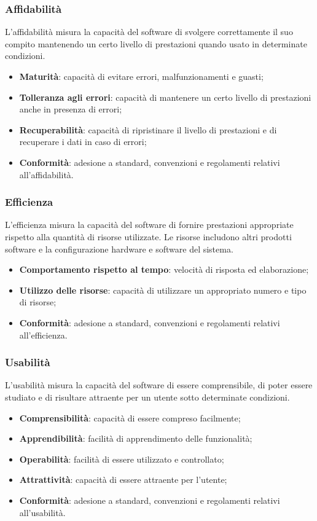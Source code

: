 \subsubsection{Affidabilità}
L'affidabilità misura la capacità del software di svolgere correttamente il suo compito
mantenendo un certo livello di prestazioni quando usato in determinate condizioni.
\begin{itemize}
    \item \textbf{Maturità}: capacità di evitare errori, malfunzionamenti e guasti;
    \item \textbf{Tolleranza agli errori}: capacità di mantenere un certo livello di prestazioni anche in presenza di errori;
    \item \textbf{Recuperabilità}: capacità di ripristinare il livello di prestazioni e di recuperare
        i dati in caso di errori;
    \item \textbf{Conformità}: adesione a standard, convenzioni e regolamenti relativi all'affidabilità.
\end{itemize}

\subsubsection{Efficienza}
L'efficienza misura la capacità del software di fornire prestazioni appropriate rispetto alla quantità di risorse utilizzate.
Le risorse includono altri prodotti software e la configurazione hardware e software del sistema.
\begin{itemize}
    \item \textbf{Comportamento rispetto al tempo}: velocità di risposta ed elaborazione;
    \item \textbf{Utilizzo delle risorse}: capacità di utilizzare un appropriato numero e tipo di risorse;
    \item \textbf{Conformità}: adesione a standard, convenzioni e regolamenti relativi all'efficienza.
\end{itemize}

\subsubsection{Usabilità}
L'usabilità misura la capacità del software di essere comprensibile, di poter essere
studiato e di risultare attraente per un utente sotto determinate condizioni.
\begin{itemize}
    \item \textbf{Comprensibilità}: capacità di essere compreso facilmente;
    \item \textbf{Apprendibilità}: facilità di apprendimento delle funzionalità;
    \item \textbf{Operabilità}: facilità di essere utilizzato e controllato;
    \item \textbf{Attrattività}: capacità di essere attraente per l'utente;
    \item \textbf{Conformità}: adesione a standard, convenzioni e regolamenti relativi all'usabilità.
\end{itemize}

